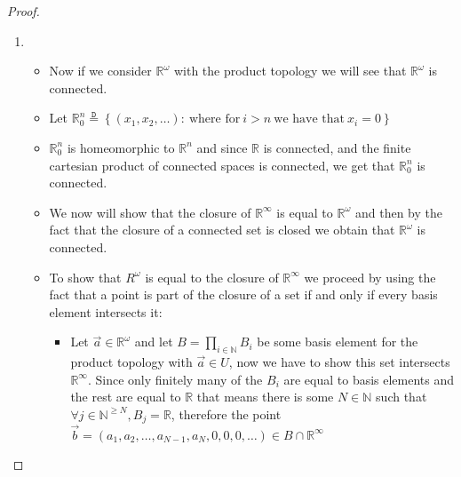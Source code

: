 \begin{proof}
\begin{enumerate}
        \item 
        \begin{itemize}
            \item Now if we consider $ \mathbb{R} ^{ \omega  }  $ with the product topology we will see that $ \mathbb{R} ^{ \omega  }  $ is connected.
            \item Let $ \mathbb{R} _{ 0 }^{ n } \stackrel{\mathtt{D}}{=} \left\{ \left( x _{ 1 } , x _{ 2 } , \ldots \right): ~\text{where for}~  i > n  ~\text{we have that}~   x _{ i } = 0   \right\}    $ 
            \item $ \mathbb{R} _{ 0 }^{ n }   $ is homeomorphic to $ \mathbb{R} ^{ n }  $ and since $ \mathbb{R}  $ is connected, and the finite cartesian product of connected spaces is connected, we get that $ \mathbb{R} _{ 0 }^{ n }  $ is connected.
            \item We now will show that the closure of $ \mathbb{R} ^{ \infty  }  $ is equal to $ \mathbb{R} ^{ \omega  }  $ and then by the fact that the closure of a connected set is closed we obtain that $ \mathbb{R} ^{  \omega  }  $ is connected.
            \item To show that $ R ^{ \omega  }  $ is equal to the closure of $ \mathbb{R} ^{ \infty  }  $ we proceed by using the fact that a point is part of the closure of a set if and only if every basis element intersects it:
            \begin{itemize}
                \item Let $ \vec{a} \in \mathbb{R} ^{ \omega  }   $ and let $ B =  \prod _{ i \in \mathbb{N}   }  B _{ i }  $ be some basis element for the product topology with $ \vec{a}  \in  U $, now we have to show this set intersects $ \mathbb{R} ^{ \infty  }  $. Since only finitely many of the $ B _{ i }  $ are equal to basis elements and the rest are equal to $ \mathbb{R}  $ that means there is some $ N \in  \mathbb{N}  $ such that $ \forall j \in  \mathbb{N} ^{ \ge N }, B _{ j } = \mathbb{R}   $, therefore the point $ \vec{b} = \left( a_{1} , a_{2} , \dotsc  , a_{N - 1} , a_{N}, 0, 0, 0, \ldots \right) \in B \cap \mathbb{R} ^{ \infty  }  $
            \end{itemize}
        \end{itemize}
    \end{enumerate}
\end{proof}

